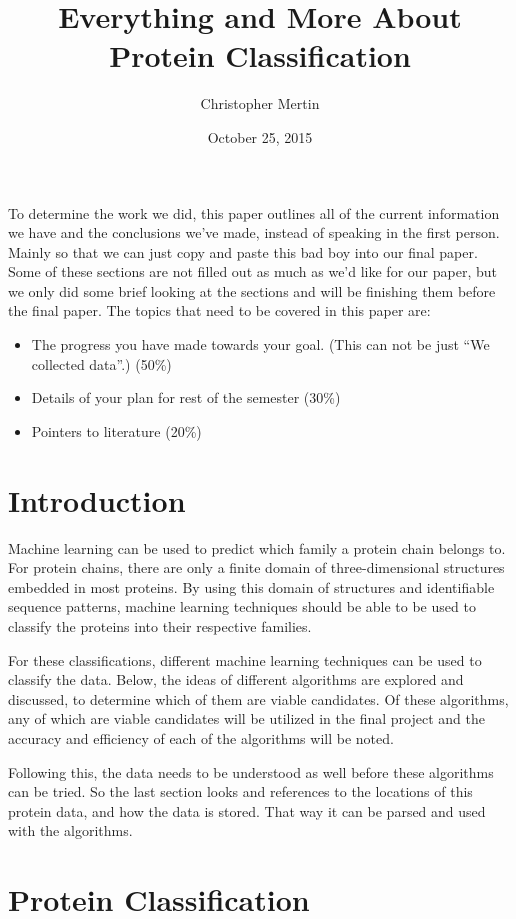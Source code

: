 \documentclass{article}
\title{Everything and More About Protein Classification}
\author{Christopher Mertin}
\date{October 25, 2015}
\begin{document}
\maketitle

To determine the work we did, this paper outlines all of the current information we have and the conclusions we've made, instead of speaking in the first person. Mainly so that we can just copy and paste this bad boy into our final paper. Some of these sections are not filled out as much as we'd like for our paper, but we only did some brief looking at the sections and will be finishing them before the final paper. The topics that need to be covered in this paper are: 
\begin{itemize}
\item The progress you have made towards your goal. (This can not be just “We collected data”.) (50\%)
\item Details of your plan for rest of the semester (30\%)
\item Pointers to literature (20\%)
\end{itemize}


\section*{Introduction}

Machine learning can be used to predict which family a protein chain belongs to. For protein chains, there are only a finite domain of three-dimensional structures embedded in most proteins. By using this domain of structures and identifiable sequence patterns, machine learning techniques should be able to be used to classify the proteins into their respective families. 

For these classifications, different machine learning techniques can be used to classify the data. Below, the ideas of different algorithms are explored and discussed, to determine which of them are viable candidates. Of these algorithms, any of which are viable candidates will be utilized in the final project and the accuracy and efficiency of each of the algorithms will be noted. 

Following this, the data needs to be understood as well before these algorithms can be tried. So the last section looks and references to the locations of this protein data, and how the data is stored. That way it can be parsed and used with the algorithms.

\section*{Protein Classification}
\end{document}
